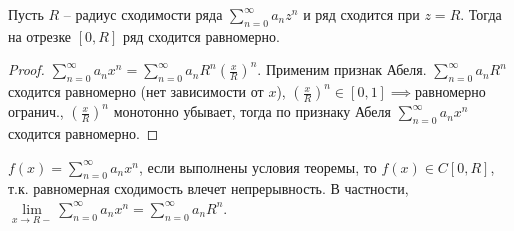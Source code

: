 \begin{theorem}[Абеля] \thmslashn

	Пусть $R$ -- радиус сходимости ряда $\sum\limits_{n = 0}^{\infty}a_nz^n$ и ряд сходится при $z = R$. Тогда на отрезке $[0, R]$ ряд сходится равномерно.
	\begin{proof} \thmslashn
		
		$\sum\limits_{n = 0}^{\infty}a_nx^n = \sum\limits_{n = 0}^{\infty}a_nR^n\left(\frac{x}{R}\right)^n$. Применим признак Абеля. $\sum\limits_{n = 0}^{\infty}a_nR^n$ сходится равномерно (нет зависимости от $x$), $\left(\frac{x}{R}\right)^n \in [0, 1] \implies$равномерно огранич., $\left(\frac{x}{R}\right)^n$ монотонно убывает, тогда по признаку Абеля $\sum\limits_{n = 0}^{\infty}a_nx^n$ сходится равномерно.
	\end{proof}
\end{theorem}

\begin{consequence} \thmslashn

	$f(x) = \sum\limits_{n = 0}^{\infty}a_nx^n$, если выполнены условия теоремы, то $f(x) \in C[0, R]$, т.к. равномерная сходимость влечет непрерывность. В частности, $\lim\limits_{x \to R-} \sum\limits_{n = 0}^{\infty}a_nx^n = \sum\limits_{n = 0}^{\infty}a_nR^n$.
\end{consequence}
